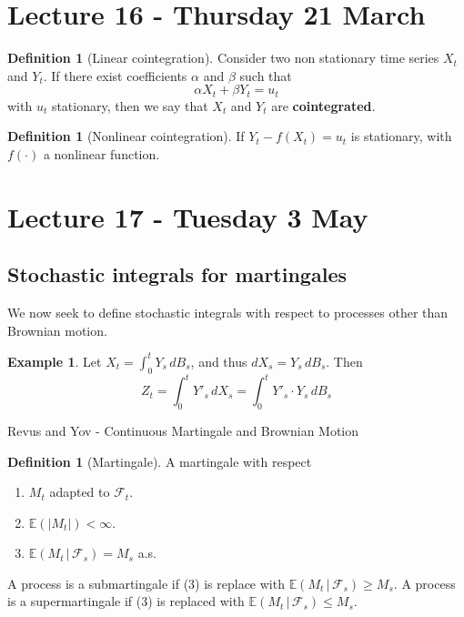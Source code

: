 \documentclass[10pt, oneside, reqno]{amsart}
\theoremstyle{plain}%
\theoremstyle{definition}
\newtheorem{defn}[thm]{Definition}
\newtheorem{exmp}[thm]{Example}
\theoremstyle{remark}
\newcommand{\given}{ \, | \,}
\newcommand{\E}{\mathbb{E}}
\newcommand{\sigf}{\mathcal{F}}
\begin{document}
\section{Lecture 16 - Thursday 21 March} %
\label{sec:lecture_16_thursday_21_march}
\begin{defn}[Linear cointegration]
    Consider two non stationary time series $X_t$ and $Y_t$.  If there exist coefficients $\alpha$ and $\beta$ such that \[
        \alpha X_t + \beta Y_t = u_t
    \] with $u_t$ stationary, then we say that $X_t$ and $Y_t$ are \textbf{cointegrated}.  
\end{defn}

\begin{defn}[Nonlinear cointegration]
    If $Y_t - f(X_t) = u_t$ is stationary, with $f(\cdot)$ a nonlinear function.   
\end{defn}




\section{Lecture 17 - Tuesday 3 May} %
\label{sec:lecture_17_tuesday_3_may}
\subsection{Stochastic integrals for martingales} %
\label{sub:stochastic_integrals_for_martingales}
We now seek to define stochastic integrals with respect to processes other than Brownian motion.  

\begin{exmp}
    Let $X_t = \int_0^t Y_s \, dB_s$, and thus $dX_s = Y_s \, dB_s$.  Then \[
        Z_t = \int_0^t Y'_s \, dX_s = \int_0^t Y'_s \cdot Y_s \, dB_s
    \]
\end{exmp}

Revus and Yov - Continuous Martingale and Brownian Motion

\begin{defn}[Martingale]
A martingale with respect
\begin{enumerate}[(1)]
    \item $M_t$ adapted to $\sigf_t$.
    \item $\E(|M_t|) < \infty$.
    \item $\E(M_t \given \sigf_s) = M_s$ a.s.
\end{enumerate}

A process is a submartingale if (3) is replace with $\E(M_t \given \sigf_s) \geq M_s$.  A process is a supermartingale if (3) is replaced with $\E(M_t \given \sigf_s) \leq M_s$.  

\end{defn}
\end{document}

